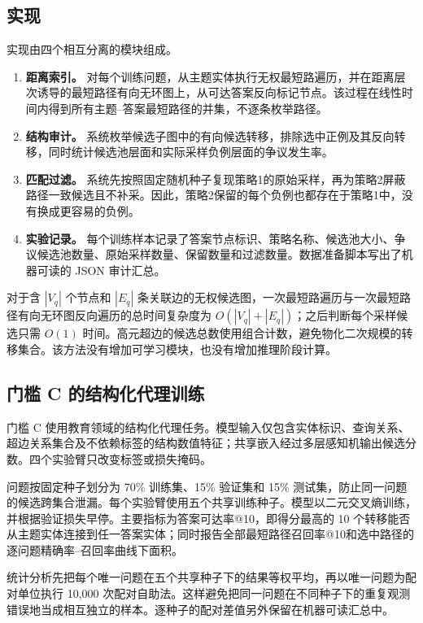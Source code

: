 \documentclass[UTF8,11pt]{ctexart}
\begin{document}
\subsection{实现}

实现由四个相互分离的模块组成。

\begin{enumerate}[leftmargin=*]
  \item \textbf{距离索引。} 对每个训练问题，从主题实体执行无权最短路遍历，并在距离层次诱导的最短路径有向无环图上，从可达答案反向标记节点。该过程在线性时间内得到所有主题--答案最短路径的并集，不逐条枚举路径。

  \item \textbf{结构审计。} 系统枚举候选子图中的有向候选转移，排除选中正例及其反向转移，同时统计候选池层面和实际采样负例层面的争议发生率。

  \item \textbf{匹配过滤。} 系统先按照固定随机种子复现策略1的原始采样，再为策略2屏蔽路径一致候选且不补采。因此，策略2保留的每个负例也都存在于策略1中，没有换成更容易的负例。

  \item \textbf{实验记录。} 每个训练样本记录了答案节点标识、策略名称、候选池大小、争议候选池数量、原始采样数量、保留数量和过滤数量。数据准备脚本写出了机器可读的 JSON 审计汇总。
\end{enumerate}

对于含 $|V_q|$ 个节点和 $|E_q|$ 条关联边的无权候选图，一次最短路遍历与一次最短路径有向无环图反向遍历的总时间复杂度为 $O(|V_q|+|E_q|)$；之后判断每个采样候选只需 $O(1)$ 时间。高元超边的候选总数使用组合计数，避免物化二次规模的转移集合。该方法没有增加可学习模块，也没有增加推理阶段计算。

\subsection{门槛 C 的结构化代理训练}

门槛 C 使用教育领域的结构化代理任务。模型输入仅包含实体标识、查询关系、超边关系集合及不依赖标签的结构数值特征；共享嵌入经过多层感知机输出候选分数。四个实验臂只改变标签或损失掩码。

问题按固定种子划分为 70\% 训练集、15\% 验证集和 15\% 测试集，防止同一问题的候选跨集合泄漏。每个实验臂使用五个共享训练种子。模型以二元交叉熵训练，并根据验证损失早停。主要指标为答案可达率@10，即得分最高的 10 个转移能否从主题实体连接到任一答案实体；同时报告全部最短路径召回率@10和选中路径的逐问题精确率--召回率曲线下面积。

统计分析先把每个唯一问题在五个共享种子下的结果等权平均，再以唯一问题为配对单位执行 10,000 次配对自助法。这样避免把同一问题在不同种子下的重复观测错误地当成相互独立的样本。逐种子的配对差值另外保留在机器可读汇总中。
\end{document}
